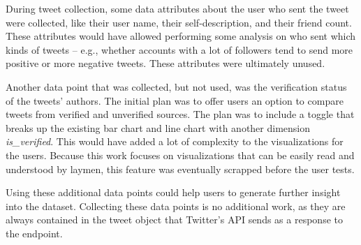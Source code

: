 During tweet collection, some data attributes about the user who sent the tweet were collected, like their user name, their self-description, and their friend count. These attributes would have allowed performing some analysis on who sent which kinds of tweets – e.g., whether accounts with a lot of followers tend to send more positive or more negative tweets. These attributes were ultimately unused.

Another data point that was collected, but not used, was the verification status of the tweets' authors. The initial plan was to offer users an option to compare tweets from verified and unverified sources. The plan was to include a toggle that breaks up the existing bar chart and line chart with another dimension \emph{is\_verified}. This would have added a lot of complexity to the visualizations for the users. Because this work focuses on visualizations that can be easily read and understood by laymen, this feature was eventually scrapped before the user tests.

Using these additional data points could help users to generate further insight into the dataset. Collecting these data points is no additional work, as they are always contained in the tweet object that Twitter's API sends as a response to the endpoint.
